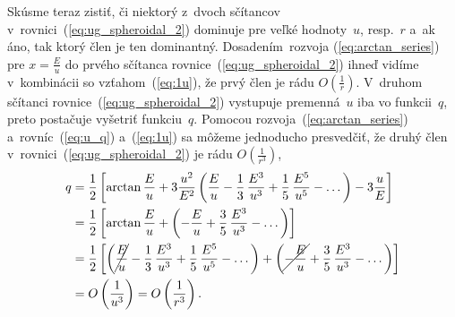 \documentclass[a4paper, 12pt]{book}
\begin{document}
Skúsme teraz zistiť, či niektorý z~dvoch sčítancov 
v~rovnici~(\ref{eq:ug_spheroidal_2}) dominuje pre veľké hodnoty~$u$, resp.~$r$ 
a~ak áno, tak ktorý člen je ten dominantný.  Dosadením~rozvoja 
(\ref{eq:arctan_series}) pre $x = \frac{E}{u}$ do prvého sčítanca 
rovnice~(\ref{eq:ug_spheroidal_2}) ihneď vidíme v~kombinácii so 
vzťahom~(\ref{eq:1u}), že prvý člen je rádu $O\left( \frac{1}{r} \right)$.  
V~druhom sčítanci rovnice~(\ref{eq:ug_spheroidal_2}) vystupuje premenná~$u$ iba 
vo funkcii~$q$, preto postačuje vyšetriť funkciu~$q$.  Pomocou 
rozvoja~(\ref{eq:arctan_series}) a~rovníc~(\ref{eq:u_q}) a~(\ref{eq:1u}) sa 
môžeme jednoducho presvedčiť, že druhý člen 
v~rovnici~(\ref{eq:ug_spheroidal_2}) je rádu $O\left( \frac{1}{r^3} \right)$,
%
\begin{equation}
\begin{split}
q &= \frac{1}{2} \left[ \arctan\frac{E}{u} + 3\frac{u^2}{E^2} \left( 
\frac{E}{u} - \frac{1}{3} \, \frac{E^3}{u^3} + \frac{1}{5} \, \frac{E^5}{u^5} 
- \dots
\right) - 3\frac{u}{E} \right]\\
%
&= \frac{1}{2} \left[ \arctan\frac{E}{u} + \left( - \frac{E}{u} + \frac{3}{5} 
\, \frac{E^3}{u^3} - \dots \right) \right]\\
%
&= \frac{1}{2} \left[ \left(\cancel{\frac{E}{u}} - \frac{1}{3} \, 
\frac{E^3}{u^3} + \frac{1}{5} \, \frac{E^5}{u^5} - \dots \right) + \left( 
\cancel{- \frac{E}{u}} + \frac{3}{5} \, \frac{E^3}{u^3} - \dots \right) 
\right]\\
%
&=O\left( \frac{1}{u^3} \right) = O\left( \frac{1}{r^3} \right){.}
\end{split}
\end{equation}
\end{document}

